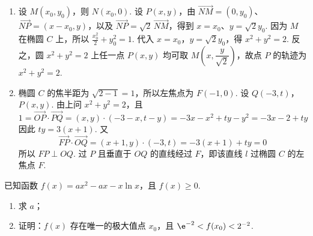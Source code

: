 \begin{solution}
\begin{enumerate}
\item 设 \(M(x_0,y_0)\)，则 \(N(x_0,0)\). 设 \(P(x,y)\)，由 \(\overrightarrow{NM}=(0,y_0)\)、\(\overrightarrow{NP}=(x-x_0,y)\)，以及 \(\overrightarrow{NP}=\sqrt2\,\overrightarrow{NM}\)，得到 \(x=x_0\)、\(y=\sqrt2y_0\).
因为 \(M\) 在椭圆 \(C\) 上，所以
\(\frac{x_0^2}{2}+y_0^2=1\).
代入 \(x=x_0\)，\(y=\sqrt2y_0\)，得
\(x^2+y^2=2\).
反之，圆 \(x^2+y^2=2\) 上任一点 \(P(x,y)\) 均可取 \(M\left(x,\dfrac y{\sqrt2}\right)\)，故点 \(P\) 的轨迹为
\(x^2+y^2=2\).

\item 椭圆 \(C\) 的焦半距为 \(\sqrt{2-1}=1\)，所以左焦点为 \(F(-1,0)\). 设 \(Q(-3,t)\)，\(P(x,y)\). 由上问 \(x^2+y^2=2\)，且
\[
1=\overrightarrow{OP}\cdot\overrightarrow{PQ}
=(x,y)\cdot(-3-x,t-y)
=-3x-x^2+ty-y^2
=-3x-2+ty
\]
因此 \(ty=3(x+1)\).
又
\[
\overrightarrow{FP}\cdot\overrightarrow{OQ}=(x+1,y)\cdot(-3,t)=-3(x+1)+ty=0
\]
所以 \(FP\perp OQ\). 过 \(P\) 且垂直于 \(OQ\) 的直线经过 \(F\)，即该直线 \(l\) 过椭圆 \(C\) 的左焦点 \(F\).
\end{enumerate}
\end{solution}

\begin{problem}
已知函数 \(f(x)=ax^2-ax-x\ln x\)，且 \(f(x)\ge 0\).

\begin{enumerate}
\item 求 \(a\)；
\item 证明：\(f(x)\) 存在唯一的极大值点 \(x_0\)，且 \(\e^{-2}<f(x_0)<2^{-2}\).
\end{enumerate}
\end{problem}

